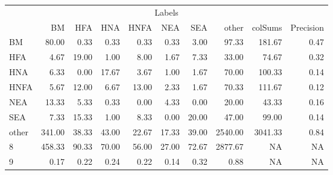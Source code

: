 \begin{table}
\centering\begingroup\fontsize{11}{13}\selectfont

\begin{tabular}{lrrrrrr>{}r|rr}
\toprule
\multicolumn{10}{c}{Labels} \\
\cmidrule(l{3pt}r{3pt}){1-10}
  & BM & HFA & HNA & HNFA & NEA & SEA & other & colSums & Precision\\
\midrule
BM & 80.00 & 0.33 & 0.33 & 0.33 & 0.33 & 3.00 & 97.33 & 181.67 & 0.47\\
HFA & 4.67 & 19.00 & 1.00 & 8.00 & 1.67 & 7.33 & 33.00 & 74.67 & 0.32\\
HNA & 6.33 & 0.00 & 17.67 & 3.67 & 1.00 & 1.67 & 70.00 & 100.33 & 0.14\\
HNFA & 5.67 & 12.00 & 6.67 & 13.00 & 2.33 & 1.67 & 70.33 & 111.67 & 0.12\\
NEA & 13.33 & 5.33 & 0.33 & 0.00 & 4.33 & 0.00 & 20.00 & 43.33 & 0.16\\
\addlinespace
SEA & 7.33 & 15.33 & 1.00 & 8.33 & 0.00 & 20.00 & 47.00 & 99.00 & 0.14\\
other & 341.00 & 38.33 & 43.00 & 22.67 & 17.33 & 39.00 & 2540.00 & 3041.33 & 0.84\\
8 & 458.33 & 90.33 & 70.00 & 56.00 & 27.00 & 72.67 & 2877.67 & NA & NA\\
9 & 0.17 & 0.22 & 0.24 & 0.22 & 0.14 & 0.32 & 0.88 & NA & NA\\
\bottomrule
\end{tabular}
\endgroup{}
\end{table}
